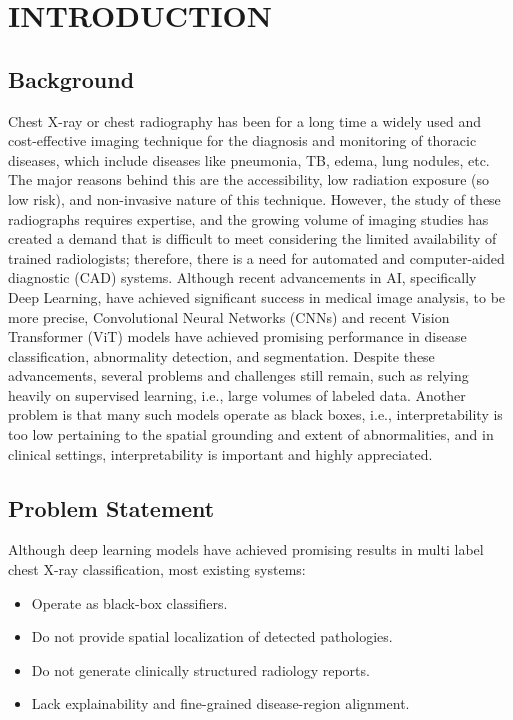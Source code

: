 \chapter{INTRODUCTION}
\graphicspath{{Chapter1/}}

\section{Background}
Chest X-ray or chest radiography has been for a long time a widely used and cost-effective imaging technique for the diagnosis and monitoring of thoracic diseases, which include diseases like pneumonia, TB, edema, lung nodules, etc. The major reasons behind this are the accessibility, low radiation exposure (so low risk), and non-invasive nature of this technique. However, the study of these radiographs requires expertise, and the growing volume of imaging studies has created a demand that is difficult to meet considering the limited availability of trained radiologists; therefore, there is a need for automated and computer-aided diagnostic (CAD) systems.
\newline
Although recent advancements in AI, specifically Deep Learning, have achieved significant success in medical image analysis, to be more precise, Convolutional Neural Networks (CNNs) and recent Vision Transformer (ViT) models have achieved promising performance in disease classification, abnormality detection, and segmentation. Despite these advancements, several problems and challenges still remain, such as relying heavily on supervised learning, i.e., large volumes of labeled data. Another problem is that many such models operate as black boxes, i.e., interpretability is too low pertaining to the spatial grounding and extent of abnormalities, and in clinical settings, interpretability is important and highly appreciated.


\section{Problem Statement}

Although deep learning models have achieved promising results in multi label chest X-ray classification, most existing systems:

\begin{itemize}
    \item Operate as black-box classifiers.
    \item Do not provide spatial localization of detected pathologies.
    \item Do not generate clinically structured radiology reports.
    \item Lack explainability and fine-grained disease-region alignment.
\end{itemize}

